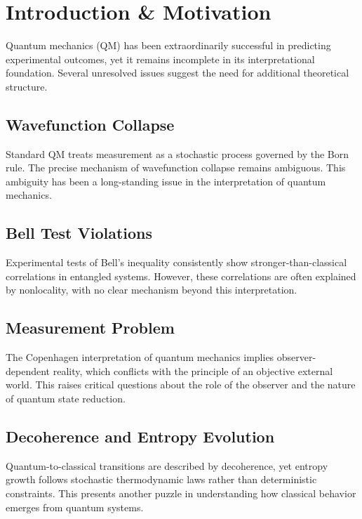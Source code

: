 \section{Introduction \& Motivation}

Quantum mechanics (QM) has been extraordinarily successful in predicting experimental outcomes, yet it remains incomplete in its interpretational foundation. Several unresolved issues suggest the need for additional theoretical structure.

\subsection{Wavefunction Collapse}
Standard QM treats measurement as a stochastic process governed by the Born rule. The precise mechanism of wavefunction collapse remains ambiguous. This ambiguity has been a long-standing issue in the interpretation of quantum mechanics.

\subsection{Bell Test Violations}
Experimental tests of Bell's inequality consistently show stronger-than-classical correlations in entangled systems. However, these correlations are often explained by nonlocality, with no clear mechanism beyond this interpretation.

\subsection{Measurement Problem}
The Copenhagen interpretation of quantum mechanics implies observer-dependent reality, which conflicts with the principle of an objective external world. This raises critical questions about the role of the observer and the nature of quantum state reduction.

\subsection{Decoherence and Entropy Evolution}
Quantum-to-classical transitions are described by decoherence, yet entropy growth follows stochastic thermodynamic laws rather than deterministic constraints. This presents another puzzle in understanding how classical behavior emerges from quantum systems.

